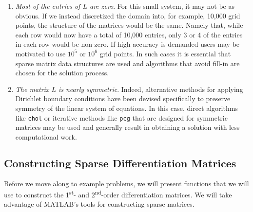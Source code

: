 \begin{enumerate}
\item \emph{Most of the entries of $L$ are zero}.  For this small system, it may not be as obvious. If we instead discretized the domain into, for example, 10,000 grid points, the structure of the matrices would be the same.  Namely that, while each row would now have a total of 10,000 entries, only 3 or 4 of the entries in each row would be non-zero.  If high accuracy is demanded users may be motivated to use $10^5$ or $10^6$ grid points.  In such cases it is essential that sparse matrix data structures are used and algorithms that avoid fill-in are chosen for the solution process.

\item \emph{The matrix $L$ is nearly symmetric}.  Indeed, alternative methods for applying Dirichlet boundary conditions have been devised specifically to preserve symmetry of the linear system of equations.  In this case, direct algorithms like \lstinline[style=myMatlab]{chol} or iterative methods like \lstinline[style=myMatlab]{pcg} that are designed for symmetric matrices may be used and generally result in obtaining a solution with less computational work.  
\end{enumerate}

\subsection{Constructing Sparse Differentiation Matrices}
Before we move along to example problems, we will present functions that we will use to construct the 1\textsuperscript{st}- and 2\textsuperscript{nd}-order differentiation matrices.  We will take advantage of MATLAB's tools for constructing sparse matrices.

